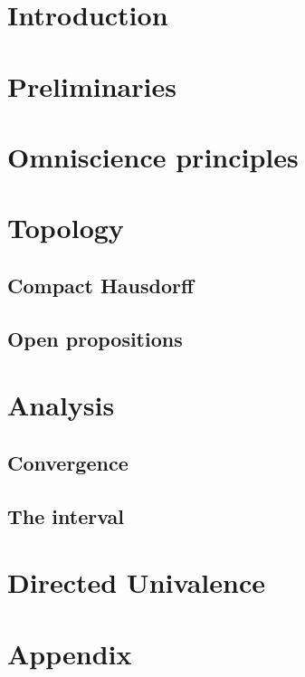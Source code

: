 \documentclass{../util/zariski-small}
\begin{document}
\section*{Introduction}


\section{Preliminaries}


\section{Omniscience principles}


\section{Topology}

\subsection{Compact Hausdorff}



\subsection{Open propositions}


\section{Analysis}

\subsection{Convergence}



\subsection{The interval}
%


\section{Directed Univalence}


\appendix
\section{Appendix}


\printbibliography
\end{document}
